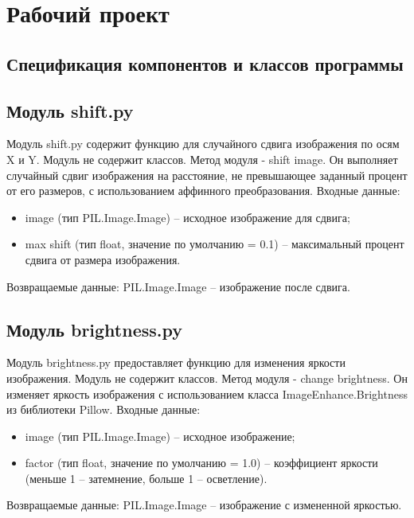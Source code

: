 \section{Рабочий проект}
\subsection{Спецификация компонентов и классов программы}

\subsection{Модуль shift.py}

Модуль shift.py содержит функцию для случайного сдвига изображения по осям X и Y. Модуль не содержит классов. Метод модуля - shift image. Он выполняет случайный сдвиг изображения на расстояние, не превышающее заданный процент от его размеров, с использованием аффинного преобразования. Входные данные:

\begin{itemize}
	\item image (тип PIL.Image.Image) – исходное изображение для сдвига;
	\item max shift (тип float, значение по умолчанию = 0.1) – максимальный процент сдвига от размера изображения.
\end{itemize}

Возвращаемые данные: PIL.Image.Image – изображение после сдвига.

\subsection{Модуль brightness.py}

Модуль brightness.py предоставляет функцию для изменения яркости изображения. Модуль не содержит классов. Метод модуля - change brightness. Он изменяет яркость изображения с использованием класса ImageEnhance.Brightness из библиотеки Pillow. Входные данные:

\begin{itemize}
	\item image (тип PIL.Image.Image) – исходное изображение;
	\item factor (тип float, значение по умолчанию = 1.0) – коэффициент яркости (меньше 1 – затемнение, больше 1 – осветление).
\end{itemize}

Возвращаемые данные: PIL.Image.Image – изображение с измененной яркостью.

